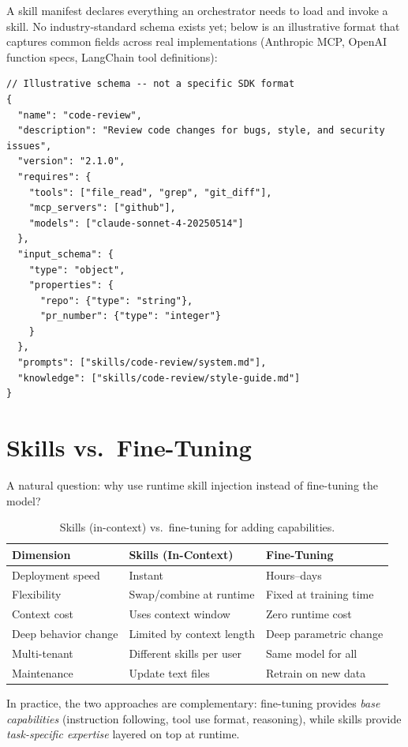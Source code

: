 \begin{examplebox}
A skill manifest declares everything an orchestrator needs to load and invoke a skill. No industry-standard schema exists yet; below is an illustrative format that captures common fields across real implementations (Anthropic MCP, OpenAI function specs, LangChain tool definitions):

\begin{lstlisting}[style=pythonstyle]
// Illustrative schema -- not a specific SDK format
{
  "name": "code-review",
  "description": "Review code changes for bugs, style, and security issues",
  "version": "2.1.0",
  "requires": {
    "tools": ["file_read", "grep", "git_diff"],
    "mcp_servers": ["github"],
    "models": ["claude-sonnet-4-20250514"]
  },
  "input_schema": {
    "type": "object",
    "properties": {
      "repo": {"type": "string"},
      "pr_number": {"type": "integer"}
    }
  },
  "prompts": ["skills/code-review/system.md"],
  "knowledge": ["skills/code-review/style-guide.md"]
}
\end{lstlisting}
\end{examplebox}

\section{Skills vs.~Fine-Tuning}
\label{skills-vs.-fine-tuning}

A natural question: why use runtime skill injection instead of fine-tuning the model?

\begin{table}[ht!]
\centering
\caption{Skills (in-context) vs.~fine-tuning for adding capabilities.}
\begin{tabular}{@{}lp{5cm}p{8cm}@{}}
\toprule
\textbf{Dimension} & \textbf{Skills (In-Context)} & \textbf{Fine-Tuning} \\
\midrule
Deployment speed & Instant & Hours--days \\
Flexibility & Swap/combine at runtime & Fixed at training time \\
Context cost & Uses context window & Zero runtime cost \\
Deep behavior change & Limited by context length & Deep parametric change \\
Multi-tenant & Different skills per user & Same model for all \\
Maintenance & Update text files & Retrain on new data \\
\bottomrule
\end{tabular}
\end{table}

In practice, the two approaches are complementary: fine-tuning provides \emph{base capabilities} (instruction following, tool use format, reasoning), while skills provide \emph{task-specific expertise} layered on top at runtime.

